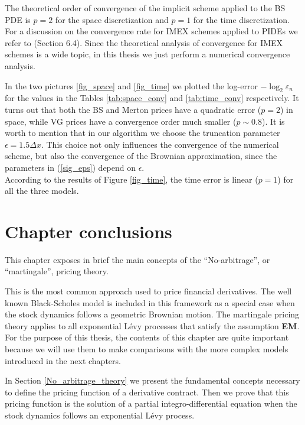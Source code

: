 The theoretical order of convergence of the implicit scheme applied to the BS PDE is $p=2$ for the space discretization and $p=1$ for the time discretization.
For a discussion on the convergence rate for IMEX schemes applied to PIDEs we refer to \cite{CoVo05b} (Section 6.4). 
Since the theoretical analysis of convergence for IMEX schemes is a wide topic, in this thesis we just perform a numerical convergence analysis.

In the two pictures \ref{fig_space} and \ref{fig_time} we plotted the log-error $- \log_2 \varepsilon_n$ for the values 
in the Tables \ref{tab:space_conv} and \ref{tab:time_conv} respectively.
It turns out that both the BS and Merton prices have a quadratic error ($p=2$) in space, while VG prices have a convergence order much smaller ($p\sim 0.8$). 
It is worth to mention that in our algorithm we choose the truncation parameter $\epsilon = 1.5 \Delta x$.
This choice not only influences the convergence of the numerical scheme, but also the convergence of the Brownian approximation, since the parameters in (\ref{sig_eps}) depend on 
$\epsilon$.\\
According to the results of Figure \ref{fig_time}, the time error is linear ($p=1$) for all the three models.



\section{Chapter conclusions}


This chapter exposes in brief  
the main concepts of the ``No-arbitrage'', or ``martingale'', pricing theory. 

This is the most common approach used to price financial derivatives. 
The well known Black-Scholes model is included in this framework as a special case when the stock dynamics follows
a geometric Brownian motion. 
The martingale pricing theory applies to all exponential Lévy processes that satisfy the assumption \textbf{EM}.
For the purpose of this thesis, the contents of this chapter are quite important because we will use them to make comparisons 
with the more complex models introduced in the next chapters.

In Section \ref{No_arbitrage_theory} we present the fundamental concepts necessary to define the pricing function of a derivative contract.
Then we prove that this pricing function is the solution of a partial integro-differential equation when the stock dynamics follows an exponential Lévy process.

